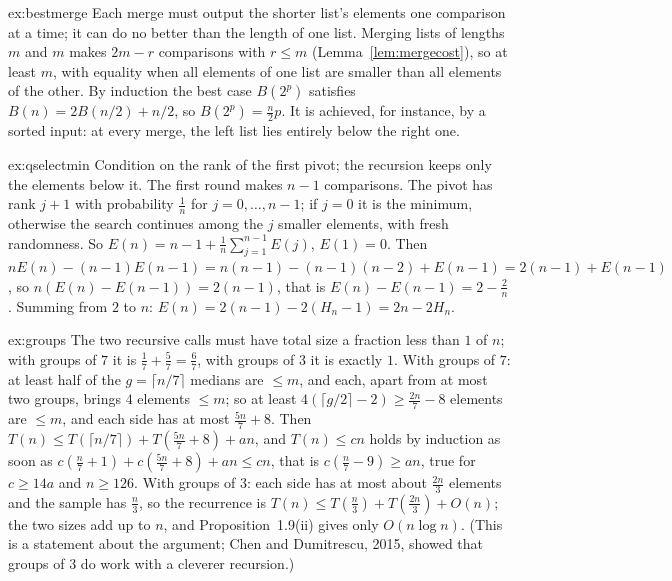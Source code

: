 \begin{solution}{ex:bestmerge}
\idea Each merge must output the shorter list's elements one comparison at a time; it can do no better than the length of one list.
\writeup Merging lists of lengths $m$ and $m$ makes $2m-r$ comparisons with $r\le m$ (Lemma~\ref{lem:mergecost}), so at least $m$, with equality when all elements of one list are smaller
than all elements of the other. By induction the best case $B(2^p)$ satisfies $B(n)=2B(n/2)+n/2$, so $B(2^p)=\frac n2p$. It is achieved, for instance, by a sorted input: at every merge, the left
list lies entirely below the right one.
\end{solution}

\begin{solution}{ex:qselectmin}
\idea Condition on the rank of the first pivot; the recursion keeps only the elements below it.
\writeup The first round makes $n-1$ comparisons. The pivot has rank $j+1$ with probability $\frac1n$ for $j=0,\dots,n-1$; if $j=0$ it is the minimum, otherwise the search continues among the $j$
smaller elements, with fresh randomness. So $E(n)=n-1+\frac1n\sum_{j=1}^{n-1}E(j)$, $E(1)=0$. Then $nE(n)-(n-1)E(n-1)=n(n-1)-(n-1)(n-2)+E(n-1)=2(n-1)+E(n-1)$, so $n(E(n)-E(n-1))=2(n-1)$, that is
$E(n)-E(n-1)=2-\frac2n$. Summing from $2$ to $n$: $E(n)=2(n-1)-2(H_n-1)=2n-2H_n$.
\end{solution}

\begin{solution}{ex:groups}
\idea The two recursive calls must have total size a fraction less than $1$ of $n$; with groups of $7$ it is $\frac17+\frac57=\frac67$, with groups of $3$ it is exactly $1$.
\writeup With groups of $7$: at least half of the $g=\lceil n/7\rceil$ medians are $\le m$, and each, apart from at most two groups, brings $4$ elements $\le m$; so at least $4(\lceil g/2\rceil-2)\ge\frac{2n}7-8$
elements are $\le m$, and each side has at most $\frac{5n}7+8$. Then $T(n)\le T(\lceil n/7\rceil)+T(\frac{5n}7+8)+an$, and $T(n)\le cn$ holds by induction as soon as
$c(\frac n7+1)+c(\frac{5n}7+8)+an\le cn$, that is $c(\frac n7-9)\ge an$, true for $c\ge14a$ and $n\ge126$. With groups of $3$: each side has at most about $\frac{2n}3$ elements and the sample has $\frac n3$,
so the recurrence is $T(n)\le T(\frac n3)+T(\frac{2n}3)+O(n)$; the two sizes add up to $n$, and Proposition~1.9(ii) gives only $O(n\log n)$. (This is a statement about the argument; Chen and Dumitrescu,
2015, showed that groups of $3$ do work with a cleverer recursion.)
\end{solution}


